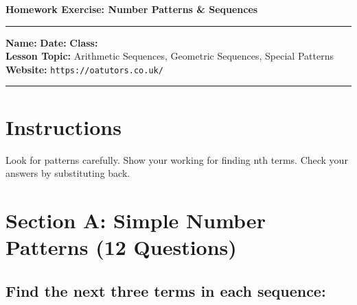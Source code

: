 \documentclass{article}
\begin{document}
\onehalfspacing


\begin{center}
\textbf{\Large Homework Exercise: Number Patterns \& Sequences}
\vspace{0.2cm}
\end{center}

\hrule
\vspace{0.1cm}

\textbf{Name:} \underline{\hspace{4cm}} \quad \textbf{Date:} \underline{\hspace{3cm}} \quad \textbf{Class:} \underline{\hspace{2cm}} \\
\textbf{Lesson Topic:} Arithmetic Sequences, Geometric Sequences, Special Patterns \\
\textbf{Website:} \texttt{https://oatutors.co.uk/}

\vspace{0.2cm}
\hrule
\vspace{0.3cm}

\section*{Instructions}
Look for patterns carefully. Show your working for finding nth terms. Check your answers by substituting back.

\section{Section A: Simple Number Patterns (12 Questions)}

\subsection*{Find the next three terms in each sequence:}
\end{document}
